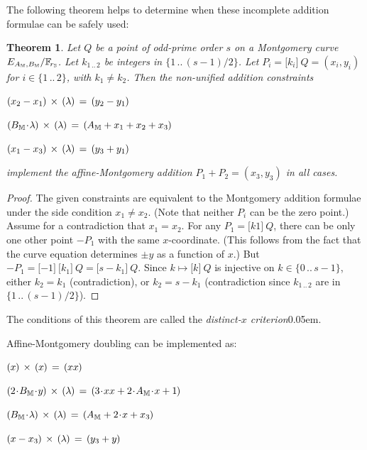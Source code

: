 \documentclass{article}
\newcommand{\introlist}{\needspace{15ex}}
\newcommand{\hairspace}{~\!}
\newtheorem{theorem}{Theorem}
\numberwithin{theorem}{subsection}
\newcommand{\term}[1]{\textsl{#1}\kern 0.05em\xspace}
\newcommand{\distinctXCriterion}{\term{distinct-$x$ criterion}}
\newcommand{\setof}[1]{\{{#1}\}}
\newcommand{\barerange}[2]{{#1}\,..\,{#2}}
\newcommand{\range}[2]{\setof{\barerange{#1}{#2}}}
\newcommand{\smult}{\!\cdot\!}
\newcommand{\scalarmult}[2]{\boldsymbol{[}{#1}\boldsymbol{]}\hairspace{#2}}
\newcommand{\lincomb}[1]{(\kern-.025em{#1}\kern-0.04em)}
\newcommand{\constraint}[3]{\lincomb{#1}\hairspace \times\hairspace \lincomb{#2}\hairspace =\hairspace \lincomb{#3}}
\newcommand{\ParamS}[1]{{{#1}_\mathbb{\hskip 0.03em S}}}
\newcommand{\ParamM}[1]{{{#1}_\mathbb{\hskip 0.03em M}}}
\newcommand{\GF}[1]{\mathbb{F}_{\!#1}}
\begin{document}
{The following theorem helps to determine when these incomplete addition formulae
can be safely used:

\introlist
\begin{theorem}
Let $Q$ be a point of odd-prime order $s$ on a Montgomery curve $E_{\ParamM{A},\ParamM{B}} / \GF{\ParamS{r}}$.
Let $k_{\barerange{1}{2}}$ be integers in $\range{1}{(s-1)/2}$.
Let $P_i = \scalarmult{k_i}{Q} = (x_i, y_i)$ for $i \in \range{1}{2}$, with
$k_1 \neq k_2$. Then the non-unified addition constraints

\begin{formulae}
  \item $\constraint{x_2 - x_1}{\lambda}{y_2 - y_1}$
  \item $\constraint{\ParamM{B} \smult \lambda}{\lambda}{\ParamM{A} + x_1 + x_2 + x_3}$
  \item $\constraint{x_1 - x_3}{\lambda}{y_3 + y_1}$
\end{formulae}

implement the affine-Montgomery addition $P_1 + P_2 = (x_3, y_3)$ in all cases.
\end{theorem}

\begin{proof}
The given constraints are equivalent to the Montgomery addition formulae
under the side condition $x_1 \neq x_2$. (Note that neither $P_i$ can be
the zero point.) Assume for a contradiction that $x_1 = x_2$. For any
$P_1 = \scalarmult{k1}{Q}$, there can be only one other point $-P_1$ with
the same $x$-coordinate. (This follows from the fact that the curve equation
determines $\pm y$ as a function of $x$.)
But $-P_1 = \scalarmult{-1}{\scalarmult{k_1}{Q}} = \scalarmult{s - k_1}{Q}$.
Since $k \mapsto \scalarmult{k}{Q}$ is injective on $k \in \range{0}{s-1}$,
either $k_2 = k_1$ (contradiction), or $k_2 = s - k_1$ (contradiction since
$k_{\barerange{1}{2}}$ are in $\range{1}{(s-1)/2}$).
\end{proof}

The conditions of this theorem are called the \distinctXCriterion.

\introlist
Affine-Montgomery doubling can be implemented as:

\begin{formulae}
  \item $\constraint{x}{x}{xx}$
  \item $\constraint{2 \smult \ParamM{B} \smult y}{\lambda}{3 \smult xx + 2 \smult \ParamM{A} \smult x + 1}$
  \item $\constraint{\ParamM{B} \smult \lambda}{\lambda}{\ParamM{A} + 2 \smult x + x_3}$
  \item $\constraint{x - x_3}{\lambda}{y_3 + y}$
\end{formulae}

}
\end{document}

